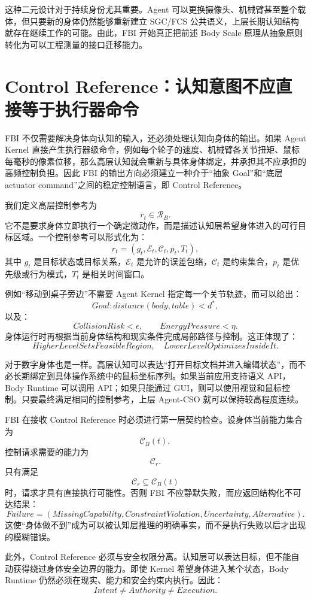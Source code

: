 这种二元设计对于持续身份尤其重要。Agent 可以更换摄像头、机械臂甚至整个载体，但只要新的身体仍然能够重新建立 SGC/FCS 公共语义，上层长期认知结构就存在继续工作的可能。由此，FBI 开始真正把前述 Body Scale 原理从抽象原则转化为可以工程测量的接口迁移能力。


\section{Control Reference：认知意图不应直接等于执行器命令}

FBI 不仅需要解决身体向认知的输入，还必须处理认知向身体的输出。如果 Agent Kernel 直接产生执行器级命令，例如每个轮子的速度、机械臂各关节扭矩、鼠标每毫秒的像素位移，那么高层认知就会重新与具体身体绑定，并承担其不应承担的高频控制负担。因此 FBI 的输出方向必须建立一种介于“抽象 Goal”和“底层 actuator command”之间的稳定控制语言，即 Control Reference。

我们定义高层控制参考为
\[
r_t
\in
\mathcal R_B.
\]
它不是要求身体立即执行一个确定微动作，而是描述认知层希望身体进入的可行目标区域。一个控制参考可以形式化为：
\[
r_t
=
(
g_t,
\mathcal E_t,
\mathcal C_t,
p_t,
T_t
),
\]
其中 \(g_t\) 是目标状态或目标关系，\(\mathcal E_t\) 是允许的误差包络，\(\mathcal C_t\) 是约束集合，\(p_t\) 是优先级或行为模式，\(T_t\) 是相关时间窗口。

例如“移动到桌子旁边”不需要 Agent Kernel 指定每一个关节轨迹，而可以给出：
\[
Goal:
distance(body,table)<d^\ast,
\]
以及：
\[
CollisionRisk<\epsilon,
\qquad
EnergyPressure<\eta.
\]
身体运行时再根据当前身体结构和现实条件完成局部路径与控制。这正体现了：
\[
\boxed{
HigherLevelSetsFeasibleRegion,
\quad
LowerLevelOptimizesInsideIt.
}
\]

对于数字身体也是一样。高层认知可以表达“打开目标文档并进入编辑状态”，而不必长期绑定到具体操作系统中的鼠标坐标序列。如果当前应用支持语义 API，Body Runtime 可以调用 API；如果只能通过 GUI，则可以使用视觉和鼠标控制。只要最终满足相同的控制参考，上层 Agent-CSO 就可以保持较高程度连续。

FBI 在接收 Control Reference 时必须进行第一层契约检查。设身体当前能力集合为
\[
\mathcal C_B(t),
\]
控制请求需要的能力为
\[
\mathcal C_r.
\]
只有满足
\[
\mathcal C_r
\subseteq
\mathcal C_B(t)
\]
时，请求才具有直接执行可能性。否则 FBI 不应静默失败，而应返回结构化不可达结果：
\[
Failure
=
(
MissingCapability,
ConstraintViolation,
Uncertainty,
Alternative
).
\]
这使“身体做不到”成为可以被认知层推理的明确事实，而不是执行失败以后才出现的模糊错误。

此外，Control Reference 必须与安全权限分离。认知层可以表达目标，但不能自动获得绕过身体安全边界的能力。即使 Kernel 希望身体进入某个状态，Body Runtime 仍然必须在现实、能力和安全约束内执行。因此：
\[
\boxed{
Intent
\neq
Authority
\neq
Execution.
}
\]

